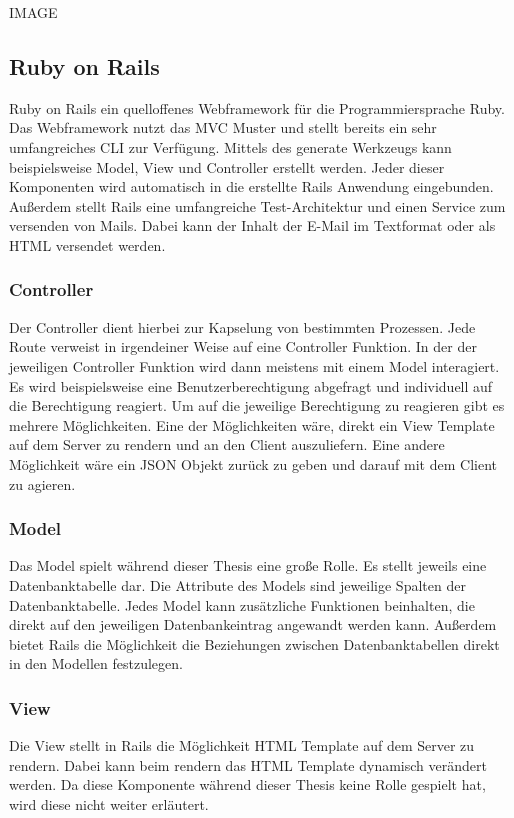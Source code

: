 \documentclass[11pt]{article}
\begin{document}
\begin{flushleft}
			IMAGE
			
			
			\subsection{Ruby on Rails}
			\label{sec: rails}
			Ruby on Rails ein quelloffenes Webframework für die Programmiersprache Ruby. Das Webframework nutzt das MVC Muster und stellt bereits ein sehr umfangreiches CLI zur Verfügung. Mittels des generate Werkzeugs kann beispielsweise Model, View und Controller erstellt werden. Jeder dieser Komponenten wird automatisch in die erstellte Rails Anwendung eingebunden. Außerdem stellt Rails eine umfangreiche Test-Architektur und einen Service zum versenden von Mails. Dabei kann der Inhalt der E-Mail im Textformat oder als HTML versendet werden.  \par\bigskip
			
			\subsubsection{Controller}
			\label{sec: rails_controller}
			Der Controller dient hierbei zur Kapselung von bestimmten Prozessen. Jede Route verweist in irgendeiner Weise auf eine Controller Funktion. In der der jeweiligen Controller Funktion wird dann meistens mit einem Model interagiert. Es wird beispielsweise eine Benutzerberechtigung abgefragt und individuell auf die Berechtigung reagiert. Um auf die jeweilige Berechtigung zu reagieren gibt es mehrere Möglichkeiten. Eine der Möglichkeiten wäre, direkt ein View Template auf dem Server zu rendern und an den Client auszuliefern. Eine andere Möglichkeit wäre ein JSON Objekt zurück zu geben und darauf mit dem Client zu agieren.
			
			\subsubsection{Model}
			\label{sec: rails_model}
			Das Model spielt während dieser Thesis eine große Rolle. Es stellt jeweils eine Datenbanktabelle dar. Die Attribute des Models sind jeweilige Spalten der Datenbanktabelle. Jedes Model kann zusätzliche Funktionen beinhalten, die direkt auf den jeweiligen Datenbankeintrag angewandt werden kann. Außerdem bietet Rails die Möglichkeit die Beziehungen zwischen Datenbanktabellen direkt in den Modellen festzulegen. 
			
			\subsubsection{View}
			\label{sec: rails_view}
			Die View stellt in Rails die Möglichkeit HTML Template auf dem Server zu rendern. Dabei kann beim rendern das HTML Template dynamisch verändert werden. Da diese Komponente während dieser Thesis keine Rolle gespielt hat, wird diese nicht weiter erläutert.\par\bigskip
			

\end{flushleft}
\end{document}
